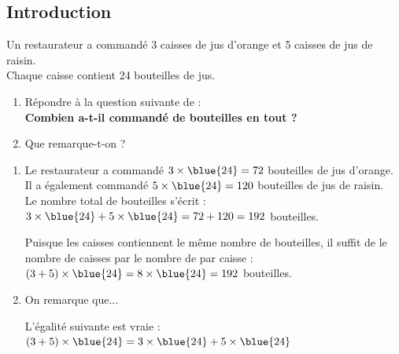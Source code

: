 \subsection{Introduction}
\begin{Activite}
    Un restaurateur a commandé 3 caisses de jus d’orange et 5 caisses de jus de raisin.\\
    Chaque caisse contient 24 bouteilles de jus.\\
    \begin{enumerate}
        \item Répondre à la question suivante de  :\\
            \textbf{Combien a-t-il commandé de bouteilles en tout ?}
        \item Que remarque-t-on ?
    \end{enumerate}
    \tcblower
    \begin{enumerate}
        \item \begin{minipage}[t]{0.475\textwidth}
            \begin{crep}
                Le restaurateur a commandé $3\times\blue{24}=72$ bouteilles de jus d'orange.\\
                Il a également commandé $5\times\blue{24}=120$ bouteilles de jus de raisin.\\
                Le nombre total de bouteilles s'écrit :\\
                $3\times \blue{24} + 5 \times \blue{24} = 72 + 120 = 192$ bouteilles.
            \end{crep}
        \end{minipage}
        \hfill
        \begin{minipage}[t]{0.475\textwidth}
            \begin{crep}
                Puisque les caisses contiennent le même nombre de bouteilles, il suffit de  le nombre de caisses  par le nombre de  par caisse : \\
                $( 3 + 5 ) \times \blue{24} = 8 \times \blue{24} = 192$ bouteilles.
            \end{crep}
        \end{minipage}

        \item On remarque que...\begin{crep}
            L'égalité suivante est vraie : \\
            $( 3 + 5 ) \times \blue{24} = 3\times \blue{24} + 5 \times \blue{24}$
        \end{crep}
    \end{enumerate}
    
\end{Activite}
